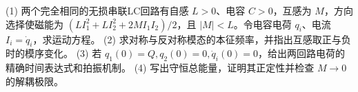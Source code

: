 (1) 两个完全相同的无损串联LC回路有自感 \(L>0\)、电容 \(C>0\)，互感为 \(M\)，方向选择使磁能为 \((L I_1^2+L I_2^2+2MI_1I_2)/2\)，且 \(|M|<L\)。令电容电荷 \(q_i\)、电流 \(I_i=\dot q_i\)，求运动方程。
(2) 求对称与反对称模态的本征频率，并指出互感取正与负时的模序变化。
(3) 若 \(q_1(0)=Q,q_2(0)=0,\dot q_i(0)=0\)，给出两回路电荷的精确时间表达式和拍振机制。
(4) 写出守恒总能量，证明其正定性并检查 \(M\to0\) 的解耦极限。
